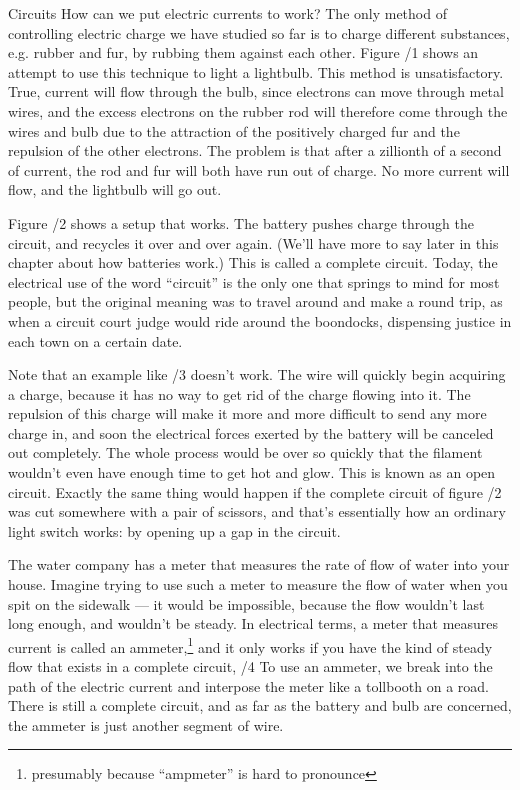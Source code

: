 \begin{envsubsection}{Circuits}
How can we put electric currents to work? The only method of
controlling electric charge we have studied so far is to
charge different substances, e.g. rubber and fur, by rubbing
them against each other. Figure /1 shows an attempt to use
this technique to light a lightbulb. This method is
unsatisfactory. True, current will flow through the bulb,
since electrons can move through metal wires, and the excess
electrons on the rubber rod will therefore come through the
wires and bulb due to the attraction of the positively
charged fur and the repulsion of the other electrons. The
problem is that after a zillionth of a second of current,
the rod and fur will both have run out of charge. No more
current will flow, and the lightbulb will go out.

Figure  /2 shows a setup that works. The battery pushes
charge through the circuit, and recycles it over and over
again. (We'll have more to say later in this chapter about
how batteries work.) This is called a complete circuit. Today, the
electrical use of the word ``circuit'' is the only one that
springs to mind for most people, but the original meaning
was to travel around and make a round trip, as when a
circuit court judge would ride around the boondocks,
dispensing justice in each town on a certain date.

Note that an example like  /3 doesn't work. The wire will
quickly begin acquiring a charge, because it has no way
to get rid of the charge flowing into it. The repulsion of
this charge will make it more and more difficult to send any
more charge in, and soon the electrical forces exerted by
the battery will be canceled out completely. The whole
process would be over so quickly that the filament wouldn't
even have enough time to get hot and glow. This is known as
an open circuit.
Exactly the same thing would happen if the complete circuit
of figure  /2 was cut somewhere with a pair of scissors, and
that's essentially how an ordinary light switch
works: by opening up a gap in the circuit.

The water company has a meter that measures the rate of flow
of water into your house. Imagine trying to use such a meter
to measure the flow of water when you spit on
the sidewalk --- it would be impossible, because the flow wouldn't
last long enough, and wouldn't be steady. In electrical terms, a
meter that measures current is called an ammeter,\footnote{presumably
because ``ampmeter'' is hard to pronounce} and it only works
if you have the kind of steady flow that exists in
a complete circuit, /4
To use an ammeter, we break
into the path of the electric current and interpose the
meter like a tollbooth on a road. There is still a
complete circuit, and as far as the battery and bulb are
concerned, the ammeter is just another segment of wire.
\end{envsubsection}
